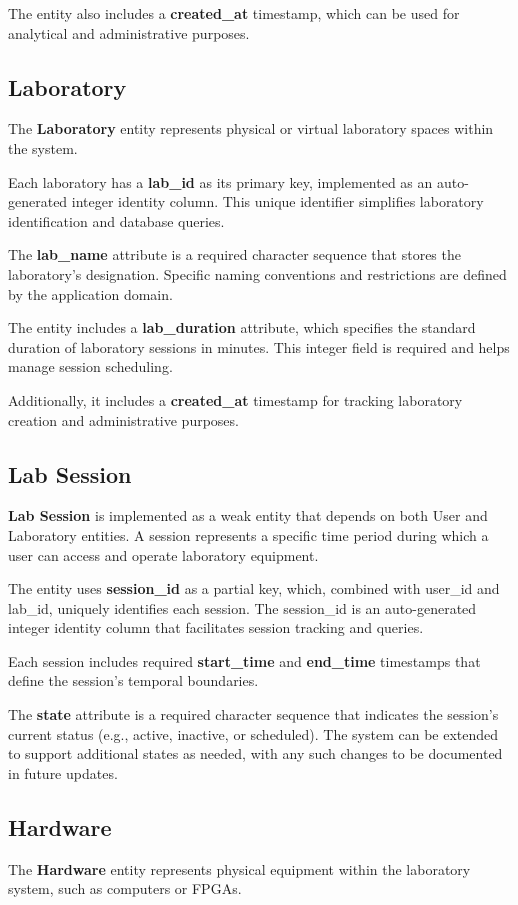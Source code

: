 The entity also includes a \textbf{created\_at} timestamp, which can be used for analytical and administrative purposes.

\subsection{Laboratory}
The \textbf{Laboratory} entity represents physical or virtual laboratory spaces within the system.

Each laboratory has a \textbf{lab\_id} as its primary key, implemented as an auto-generated integer identity column. This unique identifier simplifies laboratory identification and database queries.

The \textbf{lab\_name} attribute is a required character sequence that stores the laboratory's designation. Specific naming conventions and restrictions are defined by the application domain.

The entity includes a \textbf{lab\_duration} attribute, which specifies the standard duration of laboratory sessions in minutes. This integer field is required and helps manage session scheduling.

Additionally, it includes a \textbf{created\_at} timestamp for tracking laboratory creation and administrative purposes.

\subsection{Lab Session}
\textbf{Lab Session} is implemented as a weak entity that depends on both User and Laboratory entities. A session represents a specific time period during which a user can access and operate laboratory equipment.

The entity uses \textbf{session\_id} as a partial key, which, combined with user\_id and lab\_id, uniquely identifies each session. The session\_id is an auto-generated integer identity column that facilitates session tracking and queries.

Each session includes required \textbf{start\_time} and \textbf{end\_time} timestamps that define the session's temporal boundaries.

The \textbf{state} attribute is a required character sequence that indicates the session's current status (e.g., active, inactive, or scheduled). The system can be extended to support additional states as needed, with any such changes to be documented in future updates.

\subsection{Hardware}
The \textbf{Hardware} entity represents physical equipment within the laboratory system, such as computers or FPGAs.

